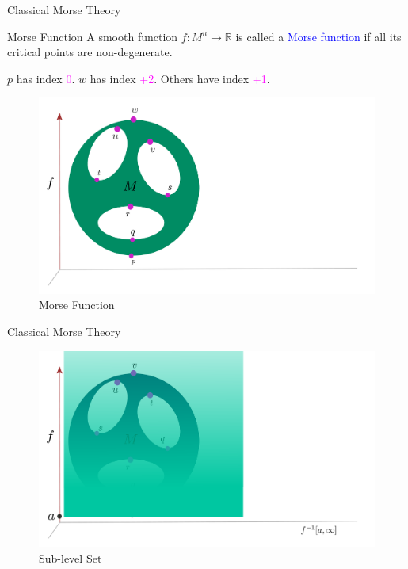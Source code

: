 \documentclass[10pt,sans-serif]{beamer}
\begin{document}
\begin{frame}{Classical Morse Theory}  
  \begin{block}{Morse Function}
    A smooth function $f:M^n\to\mathbb R$ is called a \textcolor{blue}{Morse
      function} if all its critical points are non-degenerate.  \\ \pause

    $p$ has index \textcolor{magenta}{0}. $w$ has index
    \textcolor{magenta}{+2}. Others have index \textcolor{magenta}{+1}.

  \end{block}
  
  
  \begin{figure}
    \centering
    \includegraphics[scale=0.15]{0}
    \caption{Morse Function}
  \end{figure}

\end{frame}


\begin{frame}{Classical Morse Theory}
  \begin{figure}
    \centering
    \includegraphics[scale=0.2]{1}
    \caption{Sub-level Set}
  \end{figure}
\end{frame}
\end{document}
